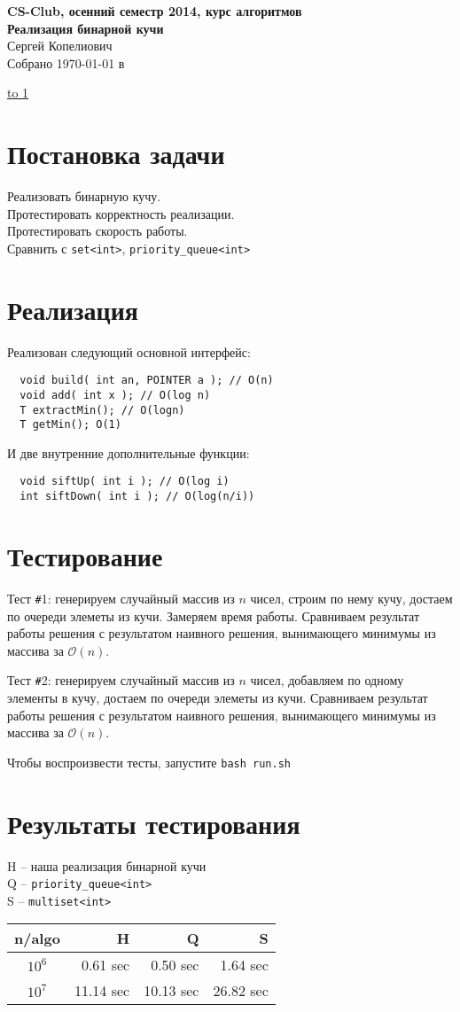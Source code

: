 \documentclass[12pt]{article}
\def\t{\texttt}
\def\O{\mathcal{O}}
\def\myindent{\hspace*{\parindent}}
\def\NO{\t{\#}}
\newcommand\Section[1]{\vspace*{-1em}\section{#1}}
\begin{document}
\begin{center}
  {\Large \bf CS-Club, осенний семестр 2014, курс алгоритмов} \\ 
  \vspace{0.5em}
  {\Large \bf Реализация бинарной кучи} \\
  \vspace{0.5em}
  {\large Сергей Копелиович} \\
  \vspace{0.5em}
  {Собрано {\today} в {\currenttime}}
\end{center}

\vspace{-1em}
\noindent \underline{\hbox to 1\textwidth{{ } \hfil{ } \hfil{ } }}

\Section{Постановка задачи}

Реализовать бинарную кучу. \\
Протестировать корректность реализации. \\
Протестировать скорость работы. \\
Сравнить с \t{set<int>}, \t{priority\_queue<int>}
              
\Section{Реализация}

Реализован следующий основной интерфейс:
\begin{verbatim}
  void build( int an, POINTER a ); // O(n)
  void add( int x ); // O(log n)
  T extractMin(); // O(logn)
  T getMin(); O(1)
\end{verbatim}
И две внутренние дополнительные функции:
\begin{verbatim}
  void siftUp( int i ); // O(log i)
  int siftDown( int i ); // O(log(n/i))
\end{verbatim}

\Section{Тестирование}

\myindent{}Тест \NO{1}: 
генерируем случайный массив из $n$ чисел, строим по нему кучу, достаем по очереди элеметы из кучи.
Замеряем время работы. 
Сравниваем результат работы решения с результатом наивного решения, вынимающего минимумы из массива за $\O(n)$. 

Тест \NO{2}:  
генерируем случайный массив из $n$ чисел, добавляем по одному элементы в кучу, достаем по очереди элеметы из кучи.
Сравниваем результат работы решения с результатом наивного решения, вынимающего минимумы из массива за $\O(n)$. 

Чтобы воспроизвести тесты, запустите \t{bash run.sh}

\Section{Результаты тестирования}

H -- наша реализация бинарной кучи \\
Q -- \t{priority\_queue<int>} \\
S -- \t{multiset<int>}

\vspace{1em}
\begin{tabular}{|c|r|r|r|}
\hline
n/algo & H & Q & S \\
\hline
$10^6$ & 0.61 sec & 0.50 sec & 1.64 sec \\
\hline
$10^7$ & 11.14 sec & 10.13 sec& 26.82 sec \\
\hline
\end{tabular}
\end{document}
